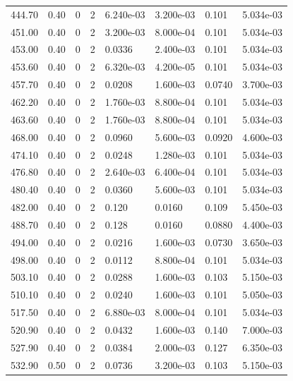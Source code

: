 \documentclass[preview]{standalone}
\begin{document}
{{{{\begin{tabular}{L{1.2cm}C{1.2cm} C{0.3cm}C{0.5cm} C{1.4cm}C{1.4cm} C{1.4cm}C{1.4cm}}
  444.70  &  0.40  & 0     &  2 &  6.240e-03  & 3.200e-03  & 0.101 &  5.034e-03   \\ 
  451.00  &  0.40  & 0     &  2 &  3.200e-03  & 8.000e-04  & 0.101 &  5.034e-03   \\ 
  453.00  &  0.40  & 0     &  2 &  0.0336  & 2.400e-03  & 0.101 &  5.034e-03   \\ 
  453.60  &  0.40  & 0     &  2 &  6.320e-03  & 4.200e-05  & 0.101 &  5.034e-03   \\ 
  457.70  &  0.40  & 0     &  2 &  0.0208  & 1.600e-03  & 0.0740 &  3.700e-03   \\ 
  462.20  &  0.40  & 0     &  2 &  1.760e-03  & 8.800e-04  & 0.101 &  5.034e-03   \\ 
  463.60  &  0.40  & 0     &  2 &  1.760e-03  & 8.800e-04  & 0.101 &  5.034e-03   \\ 
  468.00  &  0.40  & 0     &  2 &  0.0960  & 5.600e-03  & 0.0920 &  4.600e-03   \\ 
  474.10  &  0.40  & 0     &  2 &  0.0248  & 1.280e-03  & 0.101 &  5.034e-03   \\ 
  476.80  &  0.40  & 0     &  2 &  2.640e-03  & 6.400e-04  & 0.101 &  5.034e-03   \\ 
  480.40  &  0.40  & 0     &  2 &  0.0360  & 5.600e-03  & 0.101 &  5.034e-03   \\ 
  482.00  &  0.40  & 0     &  2 &  0.120  & 0.0160  & 0.109 &  5.450e-03   \\ 
  488.70  &  0.40  & 0     &  2 &  0.128  & 0.0160  & 0.0880 &  4.400e-03   \\ 
  494.00  &  0.40  & 0     &  2 &  0.0216  & 1.600e-03  & 0.0730 &  3.650e-03   \\ 
  498.00  &  0.40  & 0     &  2 &  0.0112  & 8.800e-04  & 0.101 &  5.034e-03   \\ 
  503.10  &  0.40  & 0     &  2 &  0.0288  & 1.600e-03  & 0.103 &  5.150e-03   \\ 
  510.10  &  0.40  & 0     &  2 &  0.0240  & 1.600e-03  & 0.101 &  5.050e-03   \\ 
  517.50  &  0.40  & 0     &  2 &  6.880e-03  & 8.000e-04  & 0.101 &  5.034e-03   \\ 
  520.90  &  0.40  & 0     &  2 &  0.0432  & 1.600e-03  & 0.140 &  7.000e-03   \\ 
  527.90  &  0.40  & 0     &  2 &  0.0384  & 2.000e-03  & 0.127 &  6.350e-03   \\ 
  532.90  &  0.50  & 0     &  2 &  0.0736  & 3.200e-03  & 0.103 &  5.150e-03   \\ 

\end{tabular}}}}}
\end{document}
